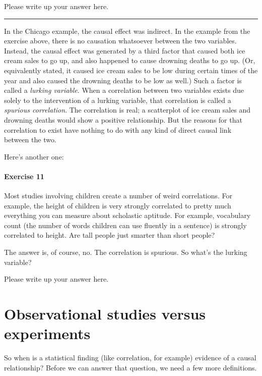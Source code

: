 \documentclass[
]{book}
\begin{document}
Please write up your answer here.

\begin{center}\rule{0.5\linewidth}{0.5pt}\end{center}

In the Chicago example, the causal effect was indirect. In the example from the exercise above, there is no causation whatsoever between the two variables. Instead, the causal effect was generated by a third factor that caused both ice cream sales to go up, and also happened to cause drowning deaths to go up. (Or, equivalently stated, it caused ice cream sales to be low during certain times of the year and also caused the drowning deaths to be low as well.) Such a factor is called a \emph{lurking variable}. When a correlation between two variables exists due solely to the intervention of a lurking variable, that correlation is called a \emph{spurious correlation}. The correlation is real; a scatterplot of ice cream sales and drowning deaths would show a positive relationship. But the reasons for that correlation to exist have nothing to do with any kind of direct causal link between the two.

Here's another one:

\hypertarget{exercise-11-2}{%
\paragraph*{Exercise 11}\label{exercise-11-2}}

Most studies involving children create a number of weird correlations. For example, the height of children is very strongly correlated to pretty much everything you can measure about scholastic aptitude. For example, vocabulary count (the number of words children can use fluently in a sentence) is strongly correlated to height. Are tall people just smarter than short people?

The answer is, of course, no. The correlation is spurious. So what's the lurking variable?

Please write up your answer here.

\hypertarget{correlation-obs-exp}{%
\section{Observational studies versus experiments}\label{correlation-obs-exp}}

So when is a statistical finding (like correlation, for example) evidence of a causal relationship? Before we can answer that question, we need a few more definitions.
\end{document}
